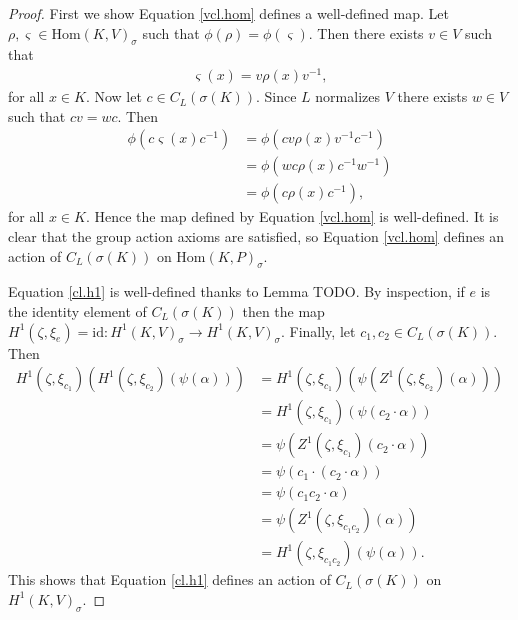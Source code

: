 \begin{proof}
	First we show Equation \ref{vcl.hom} defines a well-defined map. Let $\rho, \varsigma \in \mathrm{Hom}(K, V)_\sigma$ such that $\phi(\rho) = \phi(\varsigma)$. Then there exists $v \in V$ such that
	\begin{align*} \varsigma(x) = v\rho(x)v^{-1}, \end{align*}
		for all $x \in K$. Now let $c \in C_L(\sigma(K))$. Since $L$ normalizes $V$ there exists $w \in V$ such that $cv = wc$. Then
		\begin{align*}
			\phi \left(c \varsigma(x)c^{-1}\right) 
			&= \phi \left(cv \rho(x) v^{-1}c^{-1}\right) \\
			&= \phi \left(wc \rho(x) c^{-1}w^{-1}\right) \\
			&= \phi \left(c \rho(x) c^{-1}\right),
		\end{align*}
		for all $x \in K$. Hence the map defined by Equation \ref{vcl.hom} is well-defined. It is clear that the group action axioms are satisfied, so Equation \ref{vcl.hom} defines an action of $C_L(\sigma(K))$ on $\mathrm{Hom}(K, P)_\sigma$.

		Equation \ref{cl.h1} is well-defined thanks to Lemma TODO. By inspection, if $e$ is the identity element of $C_L(\sigma(K))$ then the map $H^1(\zeta, \xi_e) = \mathrm{id}:H^1(K, V)_\sigma \rightarrow H^1(K, V)_\sigma$. Finally, let $c_1, c_2 \in C_L(\sigma(K))$. Then
		\begin{align*}
			H^1(\zeta, \xi_{c_1})\left(H^1(\zeta, \xi_{c_2})(\psi(\alpha))\right)
			&= H^1(\zeta, \xi_{c_1})\left(\psi(Z^1(\zeta, \xi_{c_2})(\alpha))\right) \\
			&= H^1(\zeta, \xi_{c_1})\left(\psi(c_2 \cdot \alpha)\right) \\
			&= \psi\left( Z^1(\zeta, \xi_{c_1})(c_2 \cdot \alpha)\right) \\
			&= \psi\left( c_1 \cdot (c_2 \cdot \alpha)\right) \\
			&= \psi\left( c_1c_2 \cdot \alpha\right) \\
			&= \psi\left( Z^1(\zeta, \xi_{c_1c_2})(\alpha)\right) \\
			&= H^1(\zeta, \xi_{c_1c_2})\left(\psi(\alpha)\right).
		\end{align*}
		This shows that Equation \ref{cl.h1} defines an action of $C_L(\sigma(K))$ on $H^1(K, V)_\sigma$.
\end{proof}
